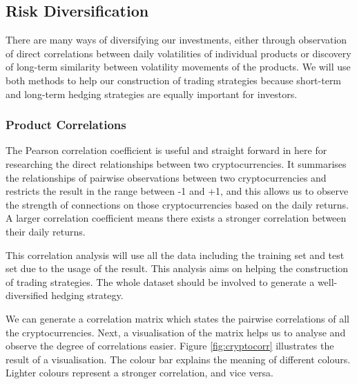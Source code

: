 \documentclass[11pt]{article} %
\theoremstyle{plain}
\theoremstyle{definition}
\begin{document}
\subsection{Risk Diversification}

There are many ways of diversifying our investments, either through observation of direct correlations between daily volatilities of individual products or discovery of long-term similarity between volatility movements of the products. We will use both methods to help our construction of trading strategies because short-term and long-term hedging strategies are equally important for investors.

\subsubsection{Product Correlations}

The Pearson correlation coefficient is useful and straight forward in here for researching the direct relationships between two cryptocurrencies. It summarises the relationships of pairwise observations between two cryptocurrencies and restricts the result in the range between -1 and +1, and this allows us to observe the strength of connections on those cryptocurrencies based on the daily returns. A larger correlation coefficient means there exists a stronger correlation between their daily returns.

This correlation analysis will use all the data including the training set and test set due to the usage of the result. This analysis aims on helping the construction of trading strategies. The whole dataset should be involved to generate a well-diversified hedging strategy.

We can generate a correlation matrix which states the pairwise correlations of all the cryptocurrencies. Next, a visualisation of the matrix helps us to analyse and observe the degree of correlations easier. Figure \ref{fig:cryptocorr} illustrates the result of a visualisation. The colour bar explains the meaning of different colours. Lighter colours represent a stronger correlation, and vice versa.
\end{document}
